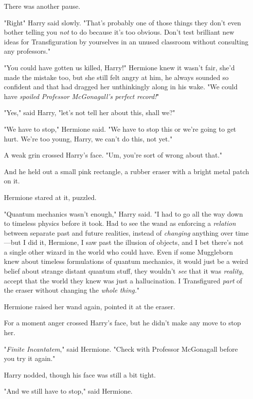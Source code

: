 There was another pause.

"Right{\el}" Harry said slowly. "That's probably one of those things they
don't even bother telling you \emph{not} to do because it's too obvious. Don't
test brilliant new ideas for Transfiguration by yourselves in an unused
classroom without consulting any professors."

"You could have gotten us killed, Harry!" Hermione knew it wasn't fair, she'd
made the mistake too, but she still felt angry at him, he always sounded so
confident and that had dragged her unthinkingly along in his wake. "We could
have \emph{spoiled Professor McGonagall's perfect record!}"

"Yes," said Harry, "let's not tell her about this, shall we?"

"We have to stop," Hermione said. "We have to stop this or we're going to get
hurt. We're too young, Harry, we can't do this, not yet."

A weak grin crossed Harry's face. "Um, you're sort of wrong about that."

And he held out a small pink rectangle, a rubber eraser with a bright metal
patch on it.

Hermione stared at it, puzzled.

"Quantum mechanics wasn't enough," Harry said. "I had to go all the way down to
timeless physics before it took. Had to see the wand as enforcing a
\emph{relation} between separate past and future realities, instead of
\emph{changing} anything over time---but I did it, Hermione, I saw past the
illusion of objects, and I bet there's not a single other wizard in the world
who could have. Even if some Muggleborn knew about timeless formulations of
quantum mechanics, it would just be a weird belief about strange distant
quantum stuff, they wouldn't \emph{see} that it was \emph{reality}, accept that
the world they knew was just a hallucination. I Transfigured \emph{part} of the
eraser without changing the \emph{whole thing.}"

Hermione raised her wand again, pointed it at the eraser.

For a moment anger crossed Harry's face, but he didn't make any move to stop
her.

"\emph{Finite Incantatem}," said Hermione. "Check with Professor McGonagall
before you try it again."

Harry nodded, though his face was still a bit tight.

"And we still have to stop," said Hermione.

